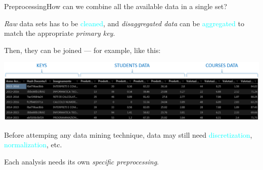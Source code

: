 \begin{frame}{Preprocessing}{How can we combine all the available data in a single set?}

\vspace{0.15cm}

    \emph{Raw} data sets has to be \textcolor{cyan}{cleaned}, and \emph{disaggregated data} can be \textcolor{cyan}{aggregated} to match the appropriate \emph{primary key}. \\

    \vspace{0.25cm}

    Then, they can be \alert{joined} --- for example, like this:

    \vspace{0.25cm}

    \begin{centering}
        \hspace*{-0.65cm}\includegraphics[scale=0.2]{prepr2.png}
    \end{centering}

\vspace{-0.35cm}
    Before attemping any data mining technique, data may still need \textcolor{cyan}{discretization}, \textcolor{cyan}{normalization}, etc. \\

 \vspace{0.25cm}

    Each analysis needs its own \emph{specific preprocessing}.

\end{frame}